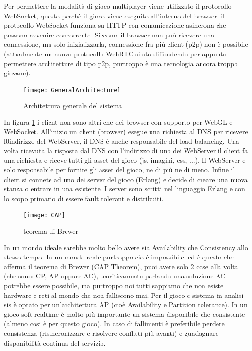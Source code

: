 \documentclass[paper=a4, fontsize=11pt]{scrartcl} %
\numberwithin{equation}{section} %
\numberwithin{figure}{section} %
\numberwithin{table}{section} %
\begin{document}
Per permettere la modalità di gioco multiplayer viene utilizzato il protocollo WebSocket, questo perchè il gioco viene eseguito all'interno del browser, il protocollo WebSocket
funziona su HTTP con comunicazione asincrona che possono avvenire concorrente.
Siccome il browser non può ricevere una connessione, ma solo inizializzarla, connessione
fra più client (p2p) non è possibile (attualmente un nuovo protocollo WebRTC si sta
diffondendo per appunto permettere architetture di tipo p2p, purtroppo è una tecnologia ancora troppo giovane).

\begin{figure}
\centering
\texttt{[image: GeneralArchitecture]}
\caption{Architettura generale del sistema}
\label{GenArc}
\end{figure}

In figura \ref{GenArc} i client non sono altri che dei browser con supporto per WebGL e WebSocket. All'inizio un client (browser) esegue una richiesta al DNS per ricevere l0indirizzo del WebServer, il DNS è anche responsabile del load balancing. Una volta ricevuta la risposta dal DNS con l'indirizzo di uno dei WebServer il client fa una richiesta e riceve tutti gli asset del gioco (js, imagini, css, ...). Il WebServer e solo responsabile per fornire gli asset del gioco, ne di più ne di meno. Infine il client si connete ad uno dei server del gioco (Erlang) e decide di creare una nuova stanza o entrare in una esistente. I server sono scritti nel linguaggio Erlang e con lo scopo primario di essere fault tolerant e distribuiti.

\begin{figure}[h]
\centering
\texttt{[image: CAP]}
\caption{teorema di Brewer}
\label{CAP}
\end{figure}

In un mondo ideale sarebbe molto bello avere sia Availability che Consistency allo stesso tempo.
In un mondo reale purtroppo cio è impossibile, ed è questo che afferma il teorema di Brewer (CAP Theorem), puoi avere solo 2 cose alla volta (che sono: CP, AP oppure AC), teoriticamente parlando una soluzione AC potrebbe essere possibile, ma purtroppo noi tutti sappiamo che non esiste hardware e reti al mondo che non falliscono mai.
Per il gioco e sistema in analisi sis è optato per un'architettura AP (cioè Availability e Partition tolerance). In un gioco soft realtime è molto più importante un sistema disponibile che consistente (almeno cosi è per questo gioco). In caso di fallimenti è preferibile perdere consistenza (risincronizzare e risolvere conflitti più avanti) e guadagnare disponibilità continua del servizio.
\end{document}
